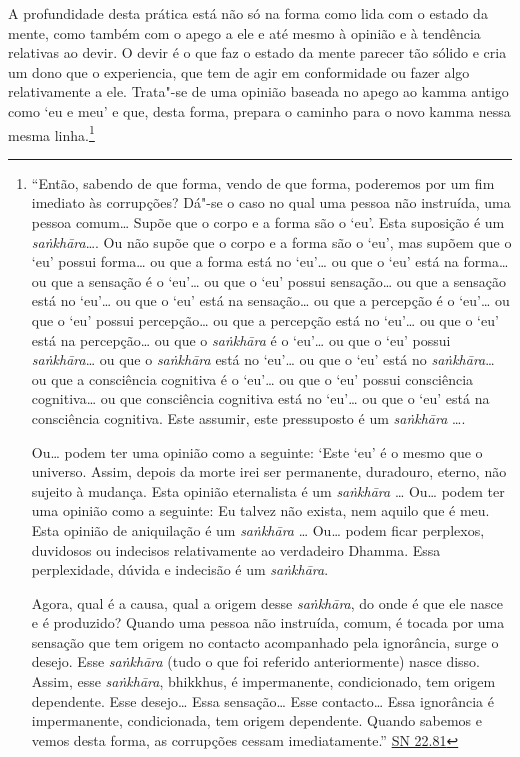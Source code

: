 A profundidade desta prática está não só na forma como lida com o estado da mente, como também com o apego a ele e até mesmo à opinião e à tendência relativas ao devir. O devir é o que faz o estado da mente parecer tão sólido e cria um dono que o experiencia, que tem de agir em conformidade ou fazer algo relativamente a ele. Trata"-se de uma opinião baseada no apego ao kamma antigo como `eu e meu' e que, desta forma, prepara o caminho para o novo kamma nessa mesma linha.\footnote{``Então, sabendo de que forma, vendo de que forma, poderemos por um fim imediato às corrupções? Dá"-se o caso no qual uma pessoa não instruída, uma pessoa comum\ldots{} Supõe que o corpo e a forma são o `eu'. Esta suposição é um \emph{saṅkhāra}\ldots{}. Ou não supõe que o corpo e a forma são o `eu', mas supõem que o `eu' possui forma\ldots{} ou que a forma está no `eu'\ldots{} ou que o `eu' está na forma\ldots{} ou que a sensação é o `eu'\ldots{} ou que o `eu' possui sensação\ldots{} ou que a sensação está no `eu'\ldots{} ou que o `eu' está na sensação\ldots{} ou que a percepção é o `eu'\ldots{} ou que o `eu' possui percepção\ldots{} ou que a percepção está no `eu'\ldots{} ou que o `eu' está na percepção\ldots{} ou que o \emph{saṅkhāra} é o `eu'\ldots{} ou que o `eu' possui \emph{saṅkhāra}\ldots{} ou que o \emph{saṅkhāra} está no `eu'\ldots{} ou que o `eu' está no \emph{saṅkhāra}\ldots{} ou que a consciência cognitiva é o `eu'\ldots{} ou que o `eu' possui consciência cognitiva\ldots{} ou que consciência cognitiva está no `eu'\ldots{} ou que o `eu' está na consciência cognitiva. Este assumir, este pressuposto é um \emph{saṅkhāra} \ldots.

  \hl{}

  Ou\ldots{} podem ter uma opinião como a seguinte: `Este `eu' é o mesmo que o universo. Assim, depois da morte irei ser permanente, duradouro, eterno, não sujeito à mudança.\textquotesingle{} Esta opinião eternalista é um \emph{saṅkhāra} \ldots{} Ou\ldots{} podem ter uma opinião como a seguinte: \textquotesingle Eu talvez não exista, nem aquilo que é meu\textquotesingle. Esta opinião de aniquilação é um \emph{saṅkhāra} \ldots{} Ou\ldots{} podem ficar perplexos, duvidosos ou indecisos relativamente ao verdadeiro Dhamma. Essa perplexidade, dúvida e indecisão é um \emph{saṅkhāra}.

  Agora, qual é a causa, qual a origem desse \emph{saṅkhāra}, do onde é que ele nasce e é produzido? Quando uma pessoa não instruída, comum, é tocada por uma sensação que tem origem no contacto acompanhado pela ignorância, surge o desejo. Esse \emph{saṅkhāra} (tudo o que foi referido anteriormente) nasce disso. Assim, esse \emph{saṅkhāra}, bhikkhus, é impermanente, condicionado, tem origem dependente. Esse desejo\ldots{} Essa sensação\ldots{} Esse contacto\ldots{} Essa ignorância é impermanente, condicionada, tem origem dependente. Quando sabemos e vemos desta forma, as corrupções cessam imediatamente.'' \href{https://suttacentral.net/sn22.81/en/bodhi}{SN 22.81}

}
